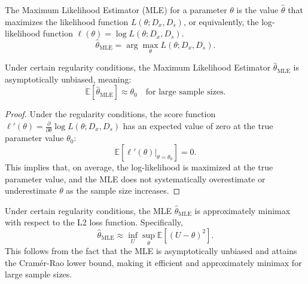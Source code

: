 \begin{definition}
	\label{def:mle}
	The Maximum Likelihood Estimator (MLE) for a parameter \( \theta \) is the value \( \hat{\theta} \) that maximizes the likelihood function \( L(\theta; D_x, D_s) \), or equivalently, the log-likelihood function \( \ell(\theta) = \log L(\theta; D_x, D_s) \).
	\begin{equation}
		\hat{\theta}_{\text{MLE}} = \arg \max_{\theta} L(\theta; D_x, D_s).
	\end{equation}
\end{definition}

\begin{theorem}
	\label{thm:unbiased_mle}
	Under certain regularity conditions, the Maximum Likelihood Estimator \( \hat{\theta}_{\text{MLE}} \) is asymptotically unbiased, meaning:
	\begin{equation}
		\mathbb{E}[\hat{\theta}_{\text{MLE}}] \approx \theta_0 \quad \text{for large sample sizes}.
	\end{equation}
\end{theorem}

\begin{proof}
	
	
	
	Under the regularity conditions, the score function \( \ell'(\theta) = \frac{\partial}{\partial \theta} \log L(\theta; D_x, D_s) \) has an expected value of zero at the true parameter value \( \theta_0 \):
	\begin{equation}
		\mathbb{E}\left[\ell'(\theta)\bigg|_{\theta = \theta_0}\right] = 0.
	\end{equation}
	This implies that, on average, the log-likelihood is maximized at the true parameter value, and the MLE does not systematically overestimate or underestimate \( \theta \) as the sample size increases.
\end{proof}

\begin{corollary}
	\label{cor:mle_minimax}
	Under certain regularity conditions, the MLE \( \hat{\theta}_{\text{MLE}} \) is approximately minimax with respect to the L2 loss function. Specifically,
	\begin{equation}
		\hat{\theta}_{\text{MLE}} \approx \inf_{U}\sup_{\theta} \mathbb{E}[(U - \theta)^2].
	\end{equation}
	This follows from the fact that the MLE is asymptotically unbiased and attains the Cramér-Rao lower bound, making it efficient and approximately minimax for large sample sizes.
\end{corollary}






